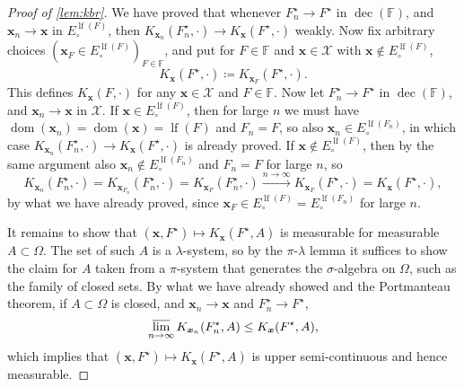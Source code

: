 \documentclass[reqno,draft]{amsart}
\numberwithin{equation}{section}
\theoremstyle{plain}
\theoremstyle{remark}
\newcommand{\tendsto}[1]{\stackrel{#1}{\longrightarrow}}
\DeclareMathOperator{\dom}{dom}
\DeclareMathOperator{\lf}{lf}
\DeclareMathOperator{\dcb}{dec}
\newcommand{\kbr}{K} %
\begin{document}
\begin{proof}[Proof of \cref{lem:kbr}]
    We have proved that whenever $F_n^\star \to F^\star$ in $\dcb(\mathbb{F})$, and $\boldsymbol x_n \to \boldsymbol x$ in $E^{\lf(F)}_\circ $, then $\kbr_{\boldsymbol x_n}(F^\star_n,\cdot ) \to \kbr_{\boldsymbol x}(F^\star,\cdot )$ weakly. Now fix arbitrary choices $(\boldsymbol x_F \in E^{\lf(F)}_\circ)_{F\in \mathbb{F}} $, and put for $F\in \mathbb{F}$ and $\boldsymbol x \in \mathcal{X}$ with $\boldsymbol x \not\in E^{\lf(F)}_\circ $, \[
        \kbr_{\boldsymbol x}(F^\star,\cdot ) \coloneqq \kbr_{\boldsymbol x_F}(F^\star,\cdot ).
    \] This defines $\kbr_{\boldsymbol x}(F,\cdot )$ for any $\boldsymbol x\in \mathcal{X}$ and $F \in \mathbb{F}$. Now let $F^\star_n \to F^\star$ in $\dcb(\mathbb{F})$, and $\boldsymbol x_n \to \boldsymbol x$ in $\mathcal{X}$. If $\boldsymbol x\in E_\circ ^{\lf(F)}$, then for large $n$ we must have $\dom(\boldsymbol x_n) = \dom(\boldsymbol x) = \lf(F)$ and $F_n = F$, so also $\boldsymbol x_n \in E_\circ ^{\lf(F_n)}$, in which case $\kbr_{\boldsymbol x_n}(F^\star_n,\cdot ) \to \kbr_{\boldsymbol x}(F^\star,\cdot )$ is already proved. If $\boldsymbol x \not\in E_\circ ^{\lf(F)}$, then by the same argument also $\boldsymbol x_n \not\in E_\circ ^{\lf(F_n)}$ and $F_n = F$ for large $n$, so \[
        \kbr_{\boldsymbol x_n}(F^\star_n,\cdot ) = \kbr_{\boldsymbol x_{F_n}}(F^\star_n,\cdot ) = \kbr_{\boldsymbol x_F}(F^\star_n,\cdot ) \tendsto{n\to \infty} \kbr_{\boldsymbol x_F}(F^\star,\cdot ) = \kbr_{\boldsymbol x}(F^\star,\cdot ),
    \] by what we have already proved, since $\boldsymbol x_F \in E^{\lf(F)}_\circ = E^{\lf(F_n)}_\circ $ for large $n$.

    It remains to show that $(\boldsymbol x,F^\star) \mapsto \kbr_{\boldsymbol x}(F^\star,A)$ is measurable for measurable $A \subset \Omega$. The set of such $A$ is a $\lambda$-system, so by the $\pi$-$\lambda$ lemma it suffices to show the claim for $A$ taken from a $\pi$-system that generates the $\sigma$-algebra on $\Omega$, such as the family of closed sets. By what we have already showed and the Portmanteau theorem, if $A \subset \Omega$ is closed, and $\boldsymbol x_n \to \boldsymbol x$ and $F^\star_n \to F^\star$, \[
        \varlimsup_{n\to \infty} \kbr_{\boldsymbol x_n}(F^\star_n,A) \le \kbr_{\boldsymbol x}(F^\star,A),
    \] which implies that $(\boldsymbol x,F^\star) \mapsto \kbr_{\boldsymbol x}(F^\star,A)$ is upper semi-continuous and hence measurable.
\end{proof}

\end{document}
